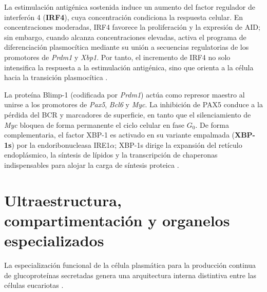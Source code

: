 La estimulación antigénica sostenida induce un aumento del factor regulador de interferón 4 (\textbf{IRF4}), cuya concentración condiciona la respuesta celular. En concentraciones moderadas, IRF4 favorece la proliferación y la expresión de AID; sin embargo, cuando alcanza concentraciones elevadas, activa el programa de diferenciación plasmocítica mediante su unión a secuencias regulatorias de los promotores de \emph{Prdm1} y \emph{Xbp1}. Por tanto, el incremento de IRF4 no solo intensifica la respuesta a la estimulación antigénica, sino que orienta a la célula hacia la transición plasmocítica \parencite{shapiroshelef2005regulation}.


La proteína Blimp-1 (codificada por \emph{Prdm1}) actúa como represor maestro al unirse a los promotores de \emph{Pax5}, \emph{Bcl6} y \emph{Myc}. La inhibición de PAX5 conduce a la pérdida del BCR y marcadores de superficie, en tanto que el silenciamiento de \emph{Myc} bloquea de forma permanente el ciclo celular en fase $G_0$. De forma complementaria, el factor XBP-1 es activado en su variante empalmada (\textbf{XBP-1s}) por la endoribonucleasa IRE1$\alpha$; XBP-1s dirige la expansión del retículo endoplásmico, la síntesis de lípidos y la transcripción de chaperonas indispensables para alojar la carga de síntesis proteica \parencite{todd2009xbp1}.

\section{Ultraestructura, compartimentación y organelos especializados}

La especialización funcional de la célula plasmática para la producción continua de glucoproteínas secretadas genera una arquitectura interna distintiva entre las células eucariotas \parencite{cenci2008progressive,karp2020cell}.

